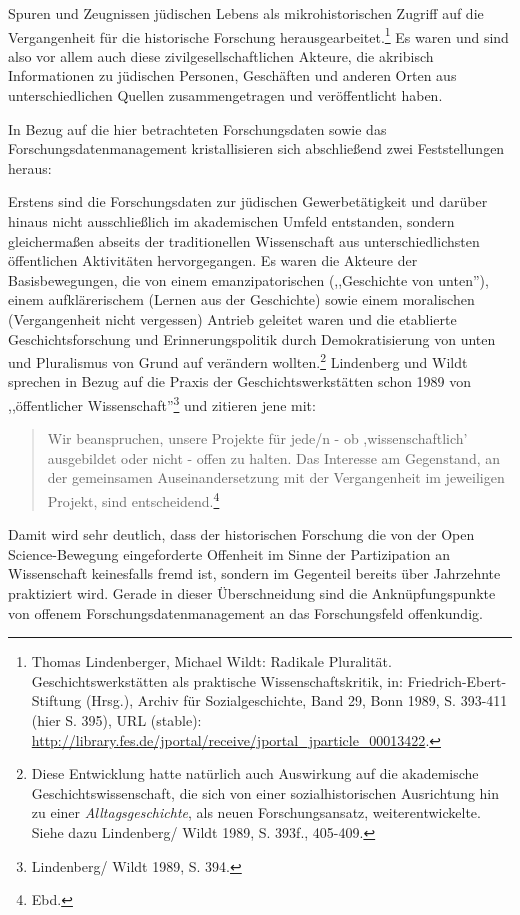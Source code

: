 Spuren und Zeugnissen jüdischen Lebens als mikrohistorischen Zugriff auf die Vergangenheit für die historische Forschung herausgearbeitet.\footnote{Thomas Lindenberger, Michael Wildt: Radikale Pluralität. Geschichtswerkstätten als praktische Wissenschaftskritik, in: Friedrich-Ebert-Stiftung (Hrsg.), Archiv für Sozialgeschichte, Band 29, Bonn 1989, S. 393-411 (hier S. 395), URL (stable): \url{http://library.fes.de/jportal/receive/jportal_jparticle_00013422}.} Es waren und sind also vor allem auch diese zivilgesellschaftlichen Akteure, die akribisch Informationen zu jüdischen Personen, Geschäften und anderen Orten aus unterschiedlichen Quellen zusammengetragen und veröffentlicht haben.

In Bezug auf die hier betrachteten Forschungsdaten sowie das Forschungsdatenmanagement kristallisieren sich abschließend zwei Feststellungen heraus:

Erstens sind die Forschungsdaten zur jüdischen Gewerbetätigkeit und darüber hinaus nicht ausschließlich im akademischen Umfeld entstanden, sondern gleichermaßen abseits der traditionellen Wissenschaft aus unterschiedlichsten öffentlichen Aktivitäten hervorgegangen. Es waren die Akteure der Basisbewegungen, die von einem emanzipatorischen (,,Geschichte von unten''), einem aufklärerischem (Lernen aus der Geschichte) sowie einem moralischen (Vergangenheit nicht vergessen) Antrieb geleitet waren und die etablierte Geschichtsforschung und Erinnerungspolitik durch Demokratisierung von unten und Pluralismus von Grund auf verändern wollten.\footnote{Diese Entwicklung hatte natürlich auch Auswirkung auf die akademische Geschichtswissenschaft, die sich von einer sozialhistorischen Ausrichtung hin zu einer \textit{Alltagsgeschichte}, als neuen Forschungsansatz, weiterentwickelte. Siehe dazu Lindenberg/ Wildt 1989, S. 393f., 405-409.} Lindenberg und Wildt sprechen in Bezug auf die Praxis der Geschichtswerkstätten schon 1989 von ,,öffentlicher Wissenschaft''\footnote{Lindenberg/ Wildt 1989, S. 394.} und zitieren jene mit:

\begin{quote}
    Wir beanspruchen, unsere Projekte für jede/n - ob ,wissenschaftlich' ausgebildet oder nicht - offen zu halten. Das Interesse am Gegenstand, an der gemeinsamen Auseinandersetzung mit der Vergangenheit im jeweiligen Projekt, sind entscheidend.\footnote{Ebd.}
\end{quote}

Damit wird sehr deutlich, dass der historischen Forschung die von der Open Science-Bewegung eingeforderte Offenheit im Sinne der Partizipation an Wissenschaft keinesfalls fremd ist, sondern im Gegenteil bereits über Jahrzehnte praktiziert wird. Gerade in dieser Überschneidung sind die Anknüpfungspunkte von offenem Forschungsdatenmanagement an das Forschungsfeld offenkundig.

